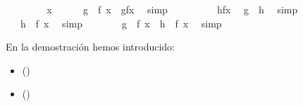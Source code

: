 \begin{isabellebody}
\ \ \isamarkupfalse%
\isanewline
\ \ \ \ \isamarkupfalse%
\ x\isanewline
\ \ \ \ \isamarkupfalse%
\ {\isachardoublequoteopen}{\isacharparenleft}g\ {\isasymcirc}\ f{\isacharparenright}\ x\ {\isacharequal}\ g{\isacharparenleft}f{\isacharparenleft}x{\isacharparenright}{\isacharparenright}{\isachardoublequoteclose}\ \isamarkupfalse%
\ simp\isanewline
\ \ \ \ \isamarkupfalse%
\ \isamarkupfalse%
\ {\isachardoublequoteopen}{\isasymdots}\ {\isacharequal}\ h{\isacharparenleft}f{\isacharparenleft}x{\isacharparenright}{\isacharparenright}{\isachardoublequoteclose}\ \isamarkupfalse%
\ {\isacharbackquoteopen}g\ {\isacharequal}\ h{\isacharbackquoteclose}\ \isamarkupfalse%
\ simp\isanewline
\ \ \ \ \isamarkupfalse%
\ \isamarkupfalse%
\ {\isachardoublequoteopen}{\isasymdots}\ {\isacharequal}\ {\isacharparenleft}h\ {\isasymcirc}\ f{\isacharparenright}\ x{\isachardoublequoteclose}\ \isamarkupfalse%
\ simp\isanewline
\ \ \ \ \isamarkupfalse%
\ \isamarkupfalse%
\ {\isachardoublequoteopen}{\isacharparenleft}g\ {\isasymcirc}\ f{\isacharparenright}\ x\ {\isacharequal}\ {\isacharparenleft}h\ {\isasymcirc}\ f{\isacharparenright}\ x{\isachardoublequoteclose}\ \isamarkupfalse%
\ simp\isanewline
\ \ \isamarkupfalse%
\isanewline
{}\isamarkupfalse%
%
\endisatagproof
{\isafoldproof}%
%
\isadelimproof
%
\endisadelimproof
%
\begin{isamarkuptext}%
En la demostración hemos introducido: 
 \begin{itemize}
    \item[]  
      \hfill () 
  \end{itemize} 
 \begin{itemize}
    \item[]  
      \hfill ()
  \end{itemize} 


\end{isamarkuptext}
\end{isabellebody}
